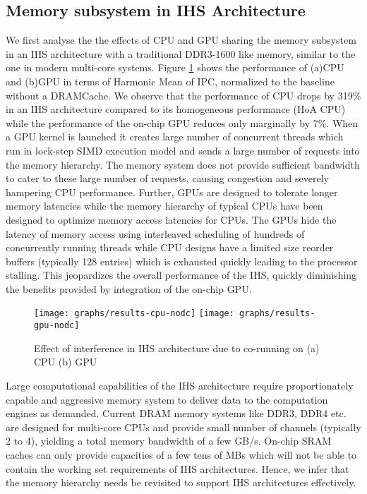\subsection{Memory subsystem in IHS Architecture}
We first analyse the the effects of CPU and GPU sharing the memory subsystem in an IHS architecture with a traditional DDR3-1600 like memory, similar to the one in modern multi-core systems. Figure \ref{results-interference} shows the performance of (a)CPU and (b)GPU in terms of Harmonic Mean of IPC, normalized to the baseline without a DRAMCache. We observe that the performance of CPU drops by 319\% in an IHS architecture compared to its homogeneous performance (HoA CPU) while the performance of the on-chip GPU reduces only marginally by 7\%. When a GPU kernel is launched it creates large number of concurrent threads which run in lock-step SIMD execution model and sends a large number of requests into the memory hierarchy. The memory system does not provide sufficient bandwidth to cater to these large number of requests, causing congestion and severely hampering CPU performance. Further, GPUs are designed to tolerate longer memory latencies while the memory hierarchy of typical CPUs have been designed to optimize memory access latencies for CPUs. The GPUs hide the latency of memory access using interleaved scheduling of hundreds of concurrently running threads while CPU designs have a limited size reorder buffers (typically 128 entries) which is exhausted quickly leading to the processor stalling. This jeopardizes the overall performance of the IHS, quickly diminishing the benefits provided by integration of the on-chip GPU.

\begin{figure}[htb]
	\centering
	\texttt{[image: graphs/results-cpu-nodc]}
	\texttt{[image: graphs/results-gpu-nodc]}
	\caption{Effect of interference in IHS architecture due to co-running on (a) CPU (b) GPU}
	\label{results-interference}
\end{figure}

\par Large computational capabilities of the IHS architecture require proportionately capable and aggressive memory system to deliver data to the computation engines as demanded. Current DRAM memory systems like DDR3, DDR4 etc. are designed for multi-core CPUs and provide small number of channels (typically 2 to 4), yielding a total memory bandwidth of a few GB/s. On-chip SRAM caches can only provide capacities of a few tens of MBs which will not be able to contain the working set requirements of IHS architectures. Hence, we infer that the memory hierarchy needs be revisited to support IHS architectures effectively.


